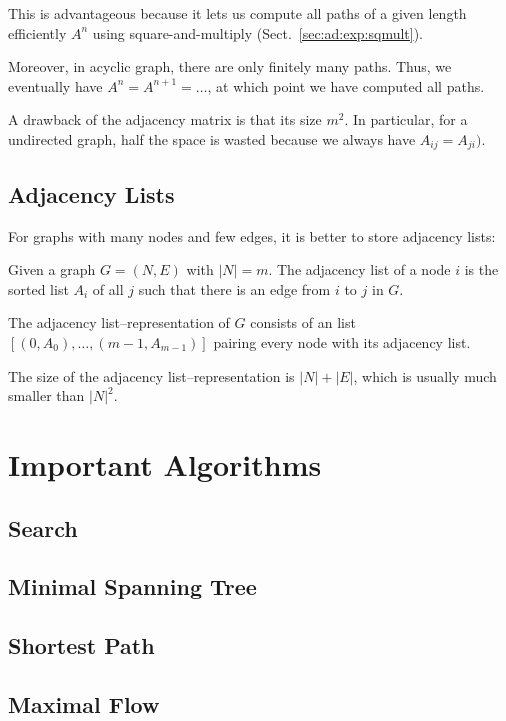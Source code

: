 This is advantageous because it lets us compute all paths of a given length efficiently $A^n$ using square-and-multiply (Sect.~\ref{sec:ad:exp:sqmult}).

Moreover, in acyclic graph, there are only finitely many paths.
Thus, we eventually have $A^n=A^{n+1}=\ldots$, at which point we have computed all paths.

A drawback of the adjacency matrix is that its size $m^2$.
In particular, for a undirected graph, half the space is wasted because we always have $A_{ij}=A_{ji})$.

\subsection{Adjacency Lists}

For graphs with many nodes and few edges, it is better to store adjacency lists:

\begin{definition}
Given a graph $G=(N,E)$ with $|N|=m$.
The adjacency list of a node $i$ is the sorted list $A_i$ of all $j$ such that there is an edge from $i$ to $j$ in $G$.

The adjacency list--representation of $G$ consists of an list $[(0,A_0),\ldots,(m-1,A_{m-1})]$ pairing every node with its adjacency list.
\end{definition}

The size of the adjacency list--representation is $|N|+|E|$, which is usually much smaller than $|N|^2$.

%
%

\section{Important Algorithms}

\subsection{Search}

\subsection{Minimal Spanning Tree}

\subsection{Shortest Path}

\subsection{Maximal Flow}

